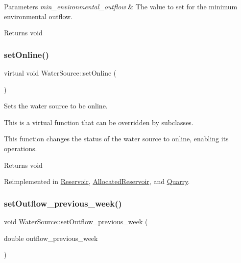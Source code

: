 \begin{DoxyParams}{Parameters}
{\em min\+\_\+environmental\+\_\+outflow} & The value to set for the minimum environmental outflow.\\
\hline
\end{DoxyParams}
\begin{DoxyReturn}{Returns}
void 
\end{DoxyReturn}
\mbox{\label{classWaterSource_aaa55dc6e14ff184380300147b53c56ec}} 
\subsubsection{\texorpdfstring{set\+Online()}{setOnline()}}
{\footnotesize\ttfamily virtual void Water\+Source\+::set\+Online (\begin{DoxyParamCaption}{ }\end{DoxyParamCaption})\hspace{0.3cm}{\ttfamily [virtual]}}



Sets the water source to be online. 

This is a virtual function that can be overridden by subclasses.

This function changes the status of the water source to online, enabling its operations.

\begin{DoxyReturn}{Returns}
void 
\end{DoxyReturn}


Reimplemented in \mbox{\hyperlink{classReservoir_ac6f64dd92c401e58095e7b125855041b}{Reservoir}}, \mbox{\hyperlink{classAllocatedReservoir_a739d93f7981f597a3db0a3d613304b8e}{Allocated\+Reservoir}}, and \mbox{\hyperlink{classQuarry_af5fe04fa188d399485b2b4e64381e169}{Quarry}}.

\mbox{\label{classWaterSource_ab53d376a425b8db603382ba27b52b1d4}} 
\subsubsection{\texorpdfstring{set\+Outflow\+\_\+previous\+\_\+week()}{setOutflow\_previous\_week()}}
{\footnotesize\ttfamily void Water\+Source\+::set\+Outflow\+\_\+previous\+\_\+week (\begin{DoxyParamCaption}\item[{double}]{outflow\+\_\+previous\+\_\+week }\end{DoxyParamCaption})}



